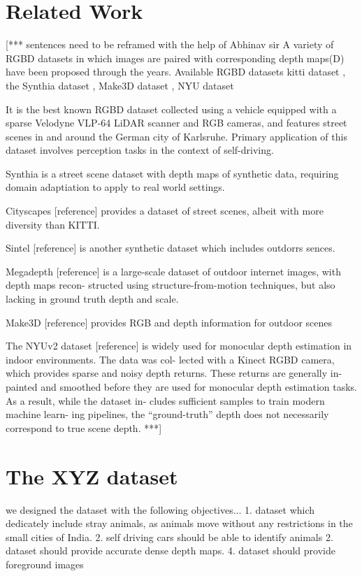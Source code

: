 \documentclass{article}
\begin{document}
\section {Related Work}
[*** sentences need to be reframed with the help of Abhinav sir
A variety of RGBD datasets in which images are paired with corresponding depth maps(D) have been proposed through the years.
Available RGBD datasets
kitti dataset \cite{geiger2013vision}, the Synthia dataset \cite{ros2016synthia}, Make3D dataset \cite{saxena2008make3d}, NYU dataset \cite{silberman2012indoor}

It is the best known RGBD dataset collected using a vehicle equipped with a sparse Velodyne VLP-64 LiDAR scanner and RGB cameras, and features street scenes in and around the German city of Karlsruhe. Primary application of this dataset involves perception tasks in the context of self-driving.

Synthia is a street scene dataset with depth maps of synthetic data, requiring domain adaptiation to apply to real world settings. 

Cityscapes [reference] provides a dataset of street scenes, albeit with more diversity than KITTI.

Sintel [reference] is another synthetic dataset which includes outdorrs sences.

Megadepth [reference] is a large-scale dataset of outdoor internet images, with depth maps recon- structed using structure-from-motion techniques, but also lacking in ground truth depth and scale.

Make3D [reference] provides RGB and depth information for outdoor scenes

The NYUv2 dataset [reference] is widely used for monocular depth estimation in indoor environments. The data was col- lected with a Kinect RGBD camera, which provides sparse and noisy depth returns. These returns are generally in- painted and smoothed before they are used for monocular depth estimation tasks. As a result, while the dataset in- cludes sufficient samples to train modern machine learn- ing pipelines, the “ground-truth” depth does not necessarily correspond to true scene depth.
***]

\section{The XYZ dataset}
we designed the dataset with the following objectives...
1. dataset which dedicately include stray animals, as animals move without any restrictions in the small cities of India.
2. self driving cars should be able to identify animals
2. dataset should provide accurate dense depth maps.
4. dataset should provide foreground images
\end{document}
